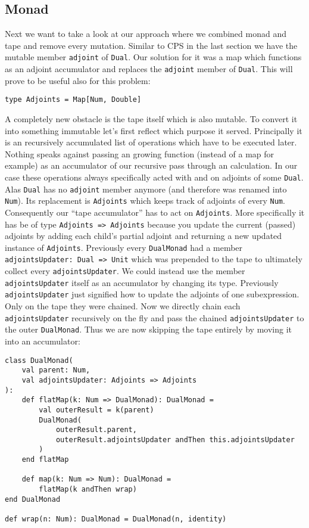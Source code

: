 \subsection{Monad} \label{sec:functionalMonad}

Next we want to take a look at our approach where we combined monad and tape and remove every mutation. Similar to CPS in the last section we have the mutable member \lstinline{adjoint} of \lstinline{Dual}. Our solution for it was a map which functions as an adjoint accumulator and replaces the \lstinline{adjoint} member of \lstinline{Dual}. This will prove to be useful also for this problem:
\begin{lstlisting}
type Adjoints = Map[Num, Double]
\end{lstlisting}

A completely new obstacle is the tape itself which is also mutable. To convert it into something immutable let's first reflect which purpose it served. Principally it is an recursively accumulated list of operations which have to be executed later. Nothing speaks against passing an growing function (instead of a map for example) as an accumulator of our recursive pass through an calculation. In our case these operations always specifically acted with and on adjoints of some \lstinline{Dual}. Alas \lstinline{Dual} has no \lstinline{adjoint} member anymore (and therefore was renamed into \lstinline{Num}). Its replacement is \lstinline{Adjoints} which keeps track of adjoints of every \lstinline{Num}. Consequently our ``tape accumulator'' has to act on \lstinline{Adjoints}. More specifically it has be of type \lstinline{Adjoints => Adjoints} because you update the current (passed) adjoints by adding each child's partial adjoint and returning a new updated instance of \lstinline{Adjoints}. Previously every \lstinline{DualMonad} had a member \lstinline{adjointsUpdater: Dual => Unit} which was prepended to the tape to ultimately collect every \lstinline{adjointsUpdater}. We could instead use the member \lstinline{adjointsUpdater} itself as an accumulator by changing its type. Previously \lstinline{adjointsUpdater} just signified how to update the adjoints of one subexpression. Only on the tape they were chained. Now we directly chain each \lstinline{adjointsUpdater} recursively on the fly and pass the chained \lstinline{adjointsUpdater} to the outer \lstinline{DualMonad}. Thus we are now skipping the tape entirely by moving it into an accumulator:
\begin{lstlisting}
class DualMonad(
    val parent: Num, 
    val adjointsUpdater: Adjoints => Adjoints
):
    def flatMap(k: Num => DualMonad): DualMonad =
        val outerResult = k(parent)
        DualMonad(
            outerResult.parent, 
            outerResult.adjointsUpdater andThen this.adjointsUpdater 
        )
    end flatMap

    def map(k: Num => Num): DualMonad =
        flatMap(k andThen wrap)
end DualMonad

def wrap(n: Num): DualMonad = DualMonad(n, identity)
\end{lstlisting}

